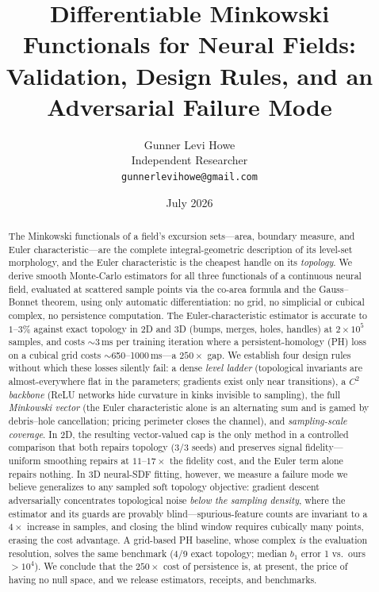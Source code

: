 \documentclass[10pt]{article}
\title{Differentiable Minkowski Functionals for Neural Fields:\\
Validation, Design Rules, and an Adversarial Failure Mode}
\author{Gunner Levi Howe\\
Independent Researcher\\
\texttt{gunnerlevihowe@gmail.com}}
\date{July 2026}
\begin{document}
\maketitle

\begin{abstract}
The Minkowski functionals of a field's excursion sets---area, boundary measure, and
Euler characteristic---are the complete integral-geometric description of its
level-set morphology, and the Euler characteristic is the cheapest handle on its
\emph{topology}. We derive smooth Monte-Carlo estimators for all three functionals of
a continuous neural field, evaluated at scattered sample points via the co-area
formula and the Gauss--Bonnet theorem, using only automatic differentiation: no grid,
no simplicial or cubical complex, no persistence computation. The Euler-characteristic
estimator is accurate to $1$--$3\%$ against exact topology in 2D and 3D (bumps,
merges, holes, handles) at $2\times10^5$ samples, and costs $\sim$3\,ms per training
iteration where a persistent-homology (PH) loss on a cubical grid costs
$\sim$650--1000\,ms---a $250\times$ gap. We establish four design rules without which
these losses silently fail: a dense \emph{level ladder} (topological invariants are
almost-everywhere flat in the parameters; gradients exist only near transitions), a
$C^2$ \emph{backbone} (ReLU networks hide curvature in kinks invisible to sampling),
the full \emph{Minkowski vector} (the Euler characteristic alone is an alternating sum
and is gamed by debris--hole cancellation; pricing perimeter closes the channel), and
\emph{sampling-scale coverage}. In 2D, the resulting vector-valued cap is the only
method in a controlled comparison that both repairs topology (3/3 seeds) and preserves
signal fidelity---uniform smoothing repairs at $11$--$17\times$ the fidelity cost, and
the Euler term alone repairs nothing. In 3D neural-SDF fitting, however, we measure a
failure mode we believe generalizes to any sampled soft topology objective: gradient
descent adversarially concentrates topological noise \emph{below the sampling
density}, where the estimator and its guards are provably blind---spurious-feature
counts are invariant to a $4\times$ increase in samples, and closing the blind window
requires cubically many points, erasing the cost advantage. A grid-based PH baseline,
whose complex \emph{is} the evaluation resolution, solves the same benchmark
(4/9 exact topology; median $b_1$ error 1 vs.\ ours $>10^4$). We conclude that the
$250\times$ cost of persistence is, at present, the price of having no null space, and
we release estimators, receipts, and benchmarks.
\end{abstract}
\end{document}
